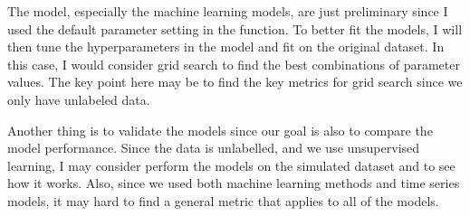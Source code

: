 \documentclass[
]{article}
\begin{document}
The model, especially the machine learning models, are just preliminary since I used the default parameter setting in the function. To better fit the models, I will then tune the hyperparameters in the model and fit on the original dataset. In this case, I would consider grid search to find the best combinations of parameter values. The key point here may be to find the key metrics for grid search since we only have unlabeled data.

Another thing is to validate the models since our goal is also to compare the model performance. Since the data is unlabelled, and we use unsupervised learning, I may consider perform the models on the simulated dataset and to see how it works. Also, since we used both machine learning methods and time series models, it may hard to find a general metric that applies to all of the models.
\end{document}
